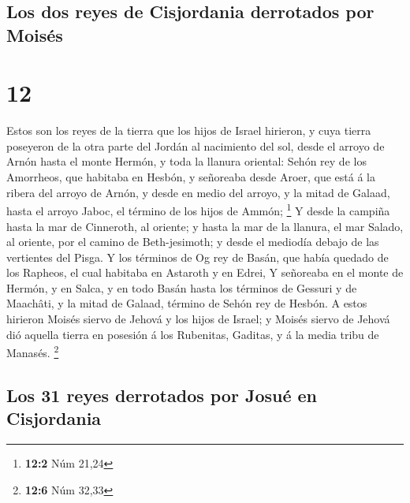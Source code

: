 \hypertarget{los-dos-reyes-de-cisjordania-derrotados-por-moisuxe9s}{%
\subsection{Los dos reyes de Cisjordania derrotados por
Moisés}\label{los-dos-reyes-de-cisjordania-derrotados-por-moisuxe9s}}

\hypertarget{section-11}{%
\section{12}\label{section-11}}

 Estos son los reyes de la tierra que los hijos de Israel
hirieron, y cuya tierra poseyeron de la otra parte del Jordán al
nacimiento del sol, desde el arroyo de Arnón hasta el monte Hermón, y
toda la llanura oriental:  Sehón rey de los Amorrheos, que
habitaba en Hesbón, y señoreaba desde Aroer, que está á la ribera del
arroyo de Arnón, y desde en medio del arroyo, y la mitad de Galaad,
hasta el arroyo Jaboc, el término de los hijos de Ammón; \footnote{\textbf{12:2}
  Núm 21,24}  Y desde la campiña hasta la mar de
Cinneroth, al oriente; y hasta la mar de la llanura, el mar Salado, al
oriente, por el camino de Beth-jesimoth; y desde el mediodía debajo de
las vertientes del Pisga.  Y los términos de Og rey de
Basán, que había quedado de los Rapheos, el cual habitaba en Astaroth y
en Edrei,  Y señoreaba en el monte de Hermón, y en Salca,
y en todo Basán hasta los términos de Gessuri y de Maachâti, y la mitad
de Galaad, término de Sehón rey de Hesbón.  A estos
hirieron Moisés siervo de Jehová y los hijos de Israel; y Moisés siervo
de Jehová dió aquella tierra en posesión á los Rubenitas, Gaditas, y á
la media tribu de Manasés. \footnote{\textbf{12:6} Núm 32,33}

\hypertarget{los-31-reyes-derrotados-por-josuuxe9-en-cisjordania}{%
\subsection{Los 31 reyes derrotados por Josué en
Cisjordania}\label{los-31-reyes-derrotados-por-josuuxe9-en-cisjordania}}

